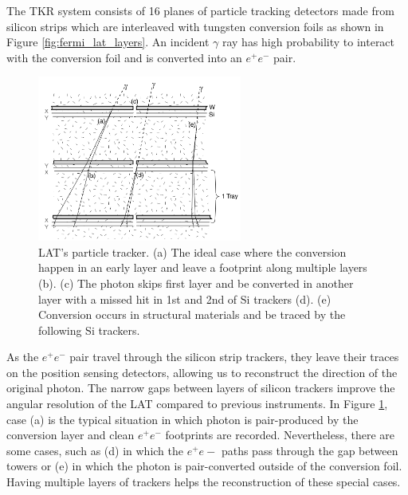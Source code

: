 The TKR system consists of 16 planes of particle tracking detectors
made from silicon strips which are interleaved with tungsten
conversion foils as shown in Figure \ref{fig:fermi_lat_layers}.
An incident
$\gamma$ ray has high probability to interact with the conversion
foil and is converted into an $e^+e^-$ pair. 

\begin{figure}[h!]
    \centering
    \includegraphics[width=0.6\textwidth]{content/background/figures/fermi_tracker.png}
    \caption{
        LAT's particle tracker.
        (a) The ideal case where the conversion happen in an early
        layer and leave a footprint along multiple layers (b).
        (c) The photon skips first layer and be converted in another layer
        with a missed hit in 1st and 2nd of Si trackers (d).
        (e) Conversion occurs in structural materials and be traced 
        by the following Si trackers.
        \citep{FermiLAT}
    }
    \label{fig:fermi_tracker}
\end{figure}

As the $e^+e^-$ pair travel through the silicon strip trackers,
they leave their traces on the position sensing detectors,
allowing us to reconstruct the direction of the original photon.
The narrow gaps between layers of silicon trackers improve the
angular resolution of the LAT compared to previous instruments.
In Figure \ref{fig:fermi_tracker},
case (a) is the typical situation in which photon
is pair-produced by the conversion layer and clean $e^+e^-$
footprints are recorded. Nevertheless, there are some cases,
such as (d) in which the $e^+e-$ paths pass through the gap
between towers or (e) in which the photon is pair-converted
outside of the conversion foil. Having multiple layers of
trackers helps the reconstruction of these special cases.

